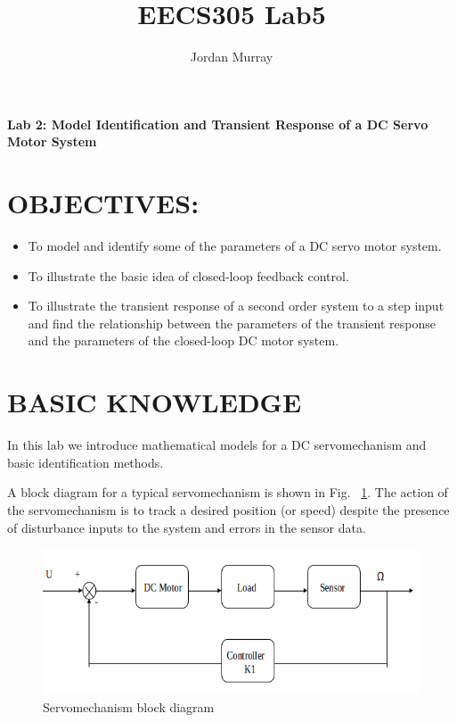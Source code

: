 \documentclass[11pt,a4paper]{article}
\author{Jordan Murray}
\title{EECS305 Lab5}
\begin{document}
\begin{center}
\fontsize{24}{12}\selectfont
\textbf{Lab 2: Model Identification and Transient Response of a DC Servo Motor System }
\end{center}

\section{OBJECTIVES:}
\begin{itemize}
\item To model and identify some of the parameters of a DC servo motor system.
\item To illustrate the basic idea of closed-loop feedback control.
\item To illustrate the transient response of a second order system to a step input and find the relationship between the parameters of the transient response and the parameters of the closed-loop DC motor system.
\end{itemize}


\section{BASIC KNOWLEDGE}
In this lab we introduce mathematical models for a DC servomechanism and basic identification methods.

A block diagram for a typical servomechanism is shown in Fig. ~\ref{fig:servoblock}.  The action of the servomechanism is to track a desired position (or speed) despite the 
presence of disturbance inputs to the system and errors in the 
sensor data.

\begin{figure}[here]
\includegraphics[width=\textwidth]{imglab/servoblockdiagram.png}
\caption{Servomechanism block diagram}
\label{fig:servoblock}
\end{figure}
\end{document}
